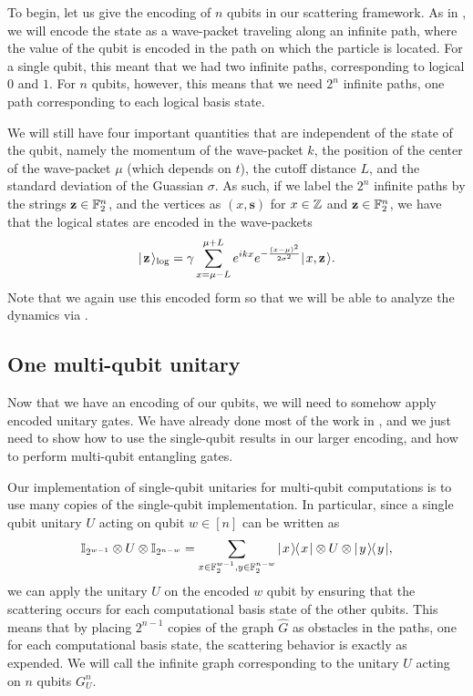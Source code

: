 \documentclass[../thesis-main/thesis-main]{subfiles}
\begin{document}
To begin, let us give the encoding of $n$ qubits in our scattering framework.  As in , we will encode the state as a wave-packet traveling along an infinite path, where the value of the qubit is encoded in the path on which the particle is located.  For a single qubit, this meant that we had two infinite paths, corresponding to logical $0$ and $1$.  For $n$ qubits, however, this means that we need $2^n$ infinite paths, one path corresponding to each logical basis state.

We will still have four important quantities that are independent of the state of the qubit, namely the momentum of the wave-packet $k$, the position of the center of the wave-packet $\mu$ (which depends on $t$), the cutoff distance $L$, and the standard deviation of the Guassian $\sigma$.  As such, if we label the $2^n$ infinite paths by the strings $\mathbf{z}\in \mathbb{F}_2^n$, and the vertices as $(x,\mathbf{s})$ for $x\in \mathbb{Z}$ and $\mathbf{z}\in \mathbb{F}_2^n$, we have that the logical states are encoded in the wave-packets
\begin{align}
  |\mspace{2mu} \mathbf{z} \mspace{2mu} \rangle_{\text{log}} = \gamma \sum_{x = \mu - L}^{\mu + L} e^{ i k x} e^{ - \frac{(x-\mu)^2}{2\sigma^2}} |\mspace{2mu} x,\mathbf{z} \mspace{2mu} \rangle \label{eq:multi_qubit_encoding}.
\end{align}
Note that we again use this encoded form so that we will be able to analyze the dynamics via .


\subsection{One multi-qubit unitary}\label{sec:multi_qubit_single_gate}

Now that we have an encoding of our qubits, we will need to somehow apply encoded unitary gates.  We have already done most of the work in , and we just need to show how to use the single-qubit results in our larger encoding, and how to perform multi-qubit entangling gates.

Our implementation of single-qubit unitaries for multi-qubit computations is to use many copies of the single-qubit implementation.  In particular, since a single qubit unitary $U$ acting on qubit $w\in [n]$ can be written as
\begin{align}
  \mathbb{I}_{2^{w-1}} \otimes U \otimes \mathbb{I}_{2^{n-w}} = \sum_{x \in \mathbb{F}_2^{w-1}, y\in \mathbb{F}_2^{n-w}} |\mspace{2mu} x \mspace{2mu} \rangle\mspace{-2mu}\langle\mspace{2mu} x \mspace{2mu} | \otimes U \otimes |\mspace{2mu} y \mspace{2mu} \rangle\mspace{-2mu}\langle\mspace{2mu} y \mspace{2mu} |,
\end{align}
we can apply the unitary $U$ on the encoded $w$ qubit by ensuring that the scattering occurs for each computational basis state of the other qubits.  This means that by placing $2^{n-1}$ copies of the graph $\widehat{G}$ as obstacles in the paths, one for each computational basis state, the scattering behavior is exactly as expended.  We will call the infinite graph corresponding to the unitary $U$ acting on $n$ qubits $G_U^n$.
\end{document}
